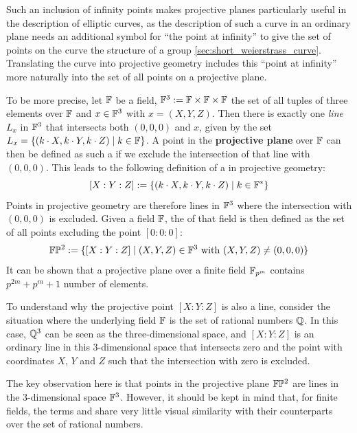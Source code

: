 Such an inclusion of infinity points makes projective planes particularly useful in the description of elliptic curves, as the description of such a curve in an ordinary plane needs an additional symbol for ``the point at infinity'' to give the set of points on the curve the structure of a group \ref{sec:short_weierstrass_curve}. Translating the curve into projective geometry includes this ``point at infinity'' more naturally into the set of all points on a projective plane.

To be more precise, let $\mathbb{F}$ be a field, $\mathbb{F}^3:=\mathbb{F}\times \mathbb{F}\times \mathbb{F}$ the set of all tuples of three elements over $\mathbb{F}$ and $x\in \mathbb{F}^3$ with $x=(X,Y,Z)$. Then there is exactly one \textit{line} $L_x$ in $\mathbb{F}^3$ that intersects both $(0,0,0)$ and $x$, given by the set $L_x=\{(k\cdot X,k\cdot Y, k\cdot Z)\;|\; k\in\mathbb{F}\}$. A point in the \textbf{projective plane} over $\mathbb{F}$ can then be defined as such a  if we exclude the intersection of that line with  $(0,0,0)$. This leads to the following definition of a  in projective geometry:
\begin{equation}
\label{def:projective_coordinate}
[X:Y:Z] := \{(k\cdot X,k\cdot Y, k\cdot Z)\;|\; k\in\mathbb{F}^*\}
\end{equation}
Points in projective geometry are therefore lines in $\mathbb{F}^3$ where the intersection with $(0,0,0)$ is excluded. Given a field $\mathbb{F}$, the  of that field is then defined as the set of all  points excluding the point $[0:0:0]$:
\begin{equation}
\mathbb{F}\mathbb{P}^2:=\{[X:Y:Z]\;|\; (X,Y,Z)\in \mathbb{F}^3\text{ with } (X,Y,Z)\neq (0,0,0)\}
\end{equation}
It can be shown that a projective plane over a finite field $\mathbb{F}_{p^m}$ contains $p^{2m}+p^m+1$ number of elements.

To understand why the projective point $[X:Y:Z]$ is also a line, consider the situation where the underlying field $\mathbb{F}$ is the set of rational numbers $\mathbb{Q}$. In this case, $\mathbb{Q}^3$ can be seen as the three-dimensional space, and $[X:Y:Z]$ is an ordinary line in this 3-dimensional space that intersects zero and the point with coordinates $X$, $Y$ and $Z$ such that the intersection with zero is excluded.

The key observation here is that points in the projective plane $\mathbb{F}\mathbb{P}^2$ are lines in the $3$-dimensional space $\mathbb{F}^3$. However, it should be kept in mind that, for finite fields, the terms  and  share very little visual similarity with their counterparts over the set of rational numbers.

